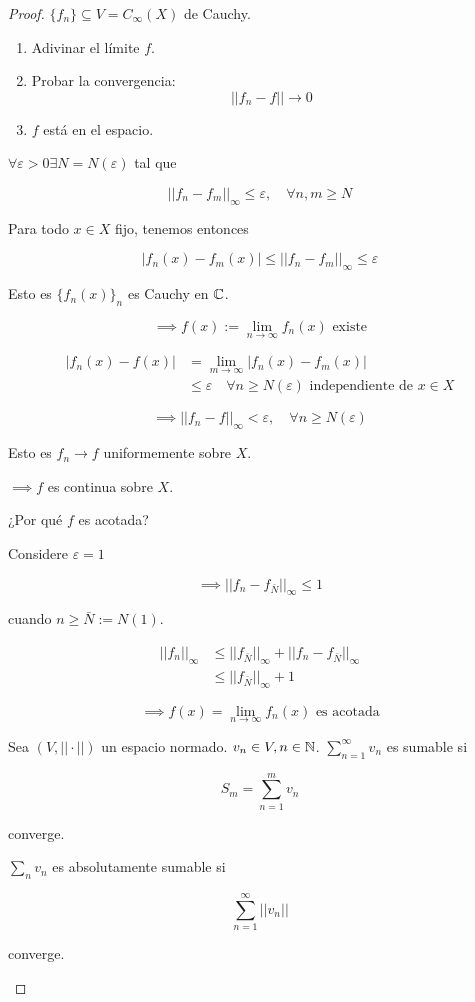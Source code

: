 \documentclass[../Apunte.tex]{subfiles}
\begin{document}
\begin{proof}
    $\{f_n\}\subseteq V=C_\infty(X)$ de Cauchy.

    \begin{enumerate}
        \item Adivinar el límite $f$.
        \item Probar la convergencia:
        \[||f_n-f||\to 0\]
        \item $f$ está en el espacio.
    \end{enumerate}

    $\forall \varepsilon>0\exists N=N(\varepsilon)$ tal que

    \[||f_n-f_m||_\infty\leq \varepsilon,\quad \forall n,m\geq N\]

    Para todo $x\in X$ fijo, tenemos entonces 

    \[|f_n(x)-f_m(x)|\leq ||f_n-f_m||_\infty\leq \varepsilon\]

    Esto es $\{f_n(x)\}_n$ es Cauchy en $\mathbb{C}$.

    \[\implies f(x):=\lim_{n\to\infty} f_n(x) \text{ existe}\]

    \begin{align*}|f_n(x)-f(x)|&=\lim_{m\to\infty} |f_n(x)-f_m(x)|\\
    &\leq \varepsilon \quad \forall n\geq N(\varepsilon) \text{ independiente de }x\in X
\end{align*}

    \[\implies ||f_n-f||_\infty<\varepsilon,\quad \forall n\geq N(\varepsilon)\]

    Esto es $f_n\to f$ uniformemente sobre $X$.

    $\implies f$ es continua sobre $X$. 

    ¿Por qué $f$ es acotada?

    Considere $\varepsilon=1$

    \[\implies ||f_n-f_{\bar N}||_\infty \leq 1\]

    cuando $n\geq \bar N:=N(1)$.

    \begin{align*}||f_n||_\infty &\leq ||f_{\bar N}||_\infty + ||f_n-f_{\bar N}||_\infty\\
    &\leq ||f_{\bar N}||_\infty +1\end{align*}

    \[\implies f(x)=\lim_{n\to\infty} f_n(x)\text{ es acotada}\]

    \begin{fdefinition}
        Sea $(V,||\cdot||)$ un espacio normado. $v_n\in V,n\in\mathbb{N}$. $\displaystyle\sum_{n=1}^\infty v_n$ es \color{red} sumable \color{black} si

        \[S_m=\sum_{n=1}^m v_n\]

        converge.

        $\displaystyle\sum_{n} v_n$ es \color{red} absolutamente sumable \color{black} si 

        \[\sum_{n=1}^\infty ||v_n||\]

        converge.
    \end{fdefinition}
\end{proof}
\end{document}
